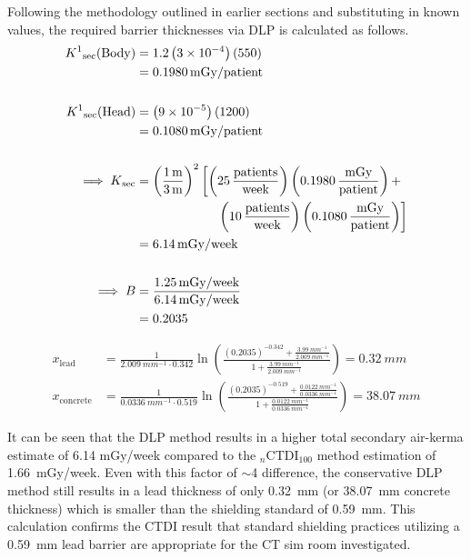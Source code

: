 \documentclass[%
aps,
mph,%
amsmath,amssymb,
preprint,%
tightenlines,
longbibliography,
superscriptaddress,
floatfix,
nofootinbib,
]{revtex4-2}
\begin{document}
        Following the methodology outlined in earlier sections and substituting in known values, the required barrier thicknesses via DLP is calculated as follows. 
        \begin{equation}
        \begin{aligned} \nonumber
            K^1\mathrm{_{sec}({Body})} &= 1.2 \left(3 \times 10^{-4}\right) (550) \\
            &= \qty{0.1980}{mGy/patient}\\ \\
            K^1\mathrm{_{sec}({Head})} &= \left(9 \times 10^{-5} \right) (1200) \\
            &= \qty{0.1080}{mGy/patient}\\ \\
            \implies K\mathrm{_{sec}} &= \left(\frac{\qty{1}{m}}{\qty{3}{m}}\right)^2  \left[ \left( \qty{25}{\frac{patients}{week}}\right)\left(\SI{0.1980}{\frac{mGy}{patient}}\right)+ \right.\\
            & \hspace{63.25pt} \left.\left(  \qty{10}{\frac{patients}{week}}\right)\left(\SI{0.1080}{\frac{mGy}{patient}}\right) \right]\\
            &= \qty{6.14}{mGy/week}\\ \\
            \implies B &= \frac{\qty{1.25}{mGy/week}}{\qty{6.14}{mGy/week}} \\
            &= 0.2035
        \end{aligned}
        \end{equation}
        
        
        \begin{align*}
            x\mathrm{_{lead}} &= \frac{1}{\qty{2.009}{mm^{-1}}\cdot0.342}\ln\left(\frac{( 0.2035)^{-0.342}+\frac{\qty{3.99}{mm^{-1}}}{\qty{2.009}{mm^{-1}}}}{1+ \frac{\qty{3.99}{mm^{-1}}}{\qty{2.009}{mm^{-1}}}} \right) = \qty{0.32}{mm}\\
            x\mathrm{_{concrete}} &= \frac{1}{\qty{0.0336}{mm^{-1}}\cdot0.519}\ln\left(\frac{( 0.2035)^{-0.519}+\frac{\qty{0.0122}{mm^{-1}}}{\qty{0.0336}{mm^{-1}}}}{1+ \frac{\qty{0.0122}{mm^{-1}}}{\qty{0.0336}{mm^{-1}}}} \right) = \qty{38.07}{mm}
        \end{align*}
        
        It can be seen that the DLP method results in a higher total secondary air-kerma estimate of 6.14 mGy/week compared to the $_n\mathrm{CTDI}_{100}$ method estimation of \qty{1.66}{mGy/week}. Even with this factor of $\sim$4 difference, the conservative DLP method still results in a lead thickness of only \qty{0.32}{mm} (or \qty{38.07}{mm} concrete thickness) which is smaller than the shielding standard of \qty{0.59}{mm}. This calculation confirms the CTDI result that standard shielding practices utilizing a \qty{0.59}{mm} lead barrier are appropriate for the CT sim room investigated. 
\end{document}
